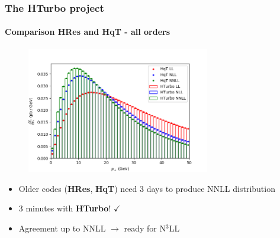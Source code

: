 \documentclass[aspectratio=43]{beamer}
\begin{document}
\begin{frame}
	
	\frametitle{The HTurbo project}
	\framesubtitle{Comparison HRes and HqT - all orders}

	
	\begin{figure}
		\includegraphics[width = 8cm]{plots/hturbo_all_orders.png}
	\end{figure}

	\begin{itemize}
		\item \footnotesize Older codes (\textbf{HRes}, \textbf{HqT}) need 3 days to produce NNLL distribution
		\item {\color{blue} 3 minutes with \textbf{HTurbo}!} {\color{darkgreen}$\checkmark$} 
		\item \footnotesize Agreement up to NNLL $\longrightarrow$ {\color{blue}ready for N$^{3}$LL}
	\end{itemize}

\end{frame}

\begin{frame}


\end{frame}
\end{document}
